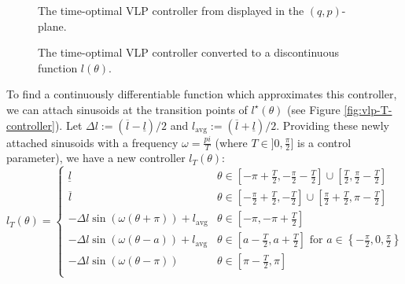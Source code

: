 \begin{figure}
   \centering
   \caption{The time-optimal VLP controller from
   \cite{pumping_swing_standing_squatting} displayed in the
\((q,p)\)-plane.}\label{fig:vlp-optimal-controller-qp-plane}
\end{figure}

\begin{figure}
   \centering
   \caption{The time-optimal VLP controller converted to a discontinuous
   function \(l(\theta)\).}\label{fig:vlp-optimal-controller}
\end{figure}

To find a continuously differentiable function which approximates this controller,
we can attach sinusoids at the transition points of
\(l^\star(\theta)\) (see Figure \ref{fig:vlp-T-controller}). Let
\(\Delta l := (\overline{l} - \underline{l})/2\) and 
\(l_{\text{avg}} := (\overline{l} + \underline{l})/2\).
Providing these newly attached sinusoids with a frequency \(\omega = \frac{pi}{T}\) 
(where \(T \in ]0,\frac{\pi}{2}]\) is a control parameter), we have a new
controller \(l_T(\theta)\):
\begin{equation}\label{eqn:vlp-T-controller}
   l_T(\theta) = \begin{cases}
      \underline{l} & \theta \in \left[-\pi + \frac{T}{2}, -\frac{\pi}{2} - \frac{T}{2}\right] 
      \cup \left[\frac{T}{2}, \frac{\pi}{2} - \frac{T}{2}\right] \\
      \overline{l} & \theta \in \left[-\frac{\pi}{2} + \frac{T}{2}, -\frac{T}{2}\right] 
      \cup \left[\frac{\pi}{2} + \frac{T}{2}, \pi - \frac{T}{2}\right] \\
      -\Delta l \sin(\omega(\theta + \pi)) + l_{\text{avg}} & \theta \in
      \left[-\pi,-\pi + \frac{T}{2}\right] \\
      -\Delta l \sin(\omega(\theta - a)) + l_\text{avg} & 
      \theta \in \left[a - \frac{T}{2}, a + \frac{T}{2}\right] \text{ for } 
      a \in \left\{-\frac{\pi}{2}, 0, \frac{\pi}{2}\right\} \\
      -\Delta l \sin(\omega(\theta-\pi)) & \theta \in \left[\pi - \frac{T}{2},\pi\right] \\
   \end{cases}
\end{equation}

